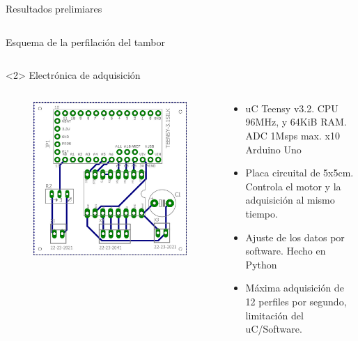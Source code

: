 \begin{frame}{Resultados prelimiares}
\begin{onlyenv}
\begin{columns}[c]
\begin{column}{0.4\textwidth}
\begin{figure}
                    \label{fig:pieza}
                \end{figure}
                Esquema de la perfilación del tambor
            \end{column}
        \end{columns}
    \end{onlyenv}

    \begin{onlyenv}<2>
        Electrónica de adquisición
        \begin{columns}[c]
            \begin{column}{0.3\textwidth}
                \begin{figure}
                    \centering
                    \includegraphics[width=\textwidth]{fig/circuito/circuito_labo6.jpg}
                    \label{fig:circuito}
                \end{figure}
            \end{column}
            \begin{column}{0.6\textwidth}
                \begin{itemize}
                    \item uC Teensy v3.2. CPU 96MHz, y 64KiB RAM. ADC 1Msps max. x10 Arduino Uno
                    \item Placa circuital de 5x5cm. Controla el motor y la adquisición al mismo tiempo. 
                    \item Ajuste de los datos por software. Hecho en Python
                    \item Máxima adquisición de 12 perfiles por segundo, limitación del uC/Software.
                \end{itemize}
            \end{column}
        \end{columns}
    \end{onlyenv}
    \end{frame}
    
